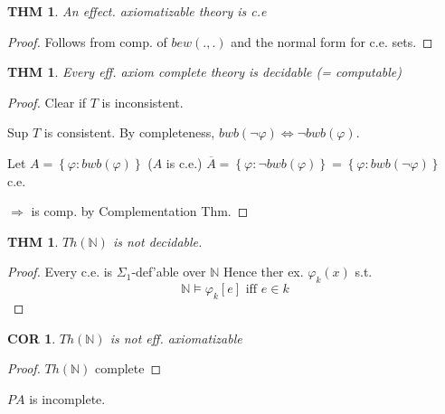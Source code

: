 \documentclass[12pt]{article}
\newcommand{\Nat}{\ensuremath{\mathbb{N}}}
\newcommand{\Conj}[1]{\ensuremath{\overline{#1}}}
\begin{document}
\newtheorem*{cethm}{THM}
\begin{cethm}
  An effect. axiomatizable theory is c.e
\end{cethm}
\begin{proof}
  Follows from comp. of $bew(.,.)$
  and the normal form for c.e. sets.
\end{proof}
\newtheorem*{decthm}{THM}
\begin{decthm}
Every eff. axiom complete theory is decidable (= computable)
\end{decthm}
\begin{proof}
  Clear if $T$ is inconsistent.

  Sup $T$ is consistent.
  By completeness, $bwb(\neg \varphi) \Leftrightarrow \neg bwb(\varphi)$.

  Let $A = \left\{\varphi : bwb(\varphi)\right\}$ ($A$ is c.e.)
  $\Conj{A} = \left\{\varphi : \neg bwb(\varphi)\right\} = \left\{\varphi : bwb(\neg \varphi) \right\}
  $ c.e.

  $\Rightarrow $ is comp. by Complementation Thm.
\end{proof}

\newtheorem*{notdecthm}{THM}
\begin{notdecthm}
  $Th(\Nat)$ is not decidable.
\end{notdecthm}
\begin{proof}
  Every c.e. is $\Sigma_1$-def'able over $\Nat$
  Hence ther ex. $\varphi_k(x)$ s.t.
  \[
  \Nat \models \varphi_k[e] \text{ iff } e \in k
  \]
\end{proof}

\newtheorem*{cor}{COR}
\begin{cor}
  $Th(\Nat)$ is not eff. axiomatizable
\end{cor}
\begin{proof}
  $Th(\Nat)$ complete
\end{proof}

$PA$ is incomplete.
\end{document}
